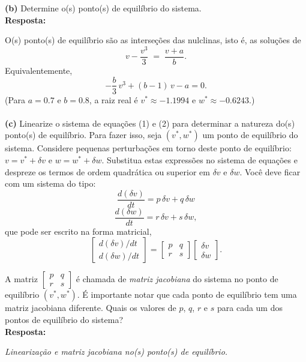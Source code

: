 \documentclass[english,11pt,a4paper]{article}
\begin{document}
	\noindent\textbf{(b)} Determine o(s) ponto(s) de equilíbrio do sistema.\\
	
	\noindent\textbf{Resposta:}
	
	\noindent O(s) ponto(s) de equilíbrio são as interseções das nulclinas, isto é, as soluções de
	\[
	v - \frac{v^3}{3} \;=\; \frac{v + a}{b}.
	\]
	\noindent Equivalentemente,
	\[
	-\frac{b}{3}\,v^3 + (b-1)\,v - a = 0.
	\]
	\noindent (Para $a=0.7$ e $b=0.8$, a raiz real é $v^\ast \approx -1.1994$ e $w^\ast \approx -0.6243$.)\\\\
	
	\noindent\textbf{(c)} Linearize o sistema de equações (1) e (2) para determinar a natureza do(s) ponto(s) de equilíbrio. Para fazer isso, seja $(v^*, w^*)$ um ponto de equilíbrio do sistema. Considere pequenas perturbações em torno deste ponto de equilíbrio: $v = v^* + \delta v$ e $w = w^* + \delta w$. Substitua estas expressões no sistema de equações e despreze os termos de ordem quadrática ou superior em $\delta v$ e $\delta w$. Você deve ficar com um sistema do tipo:
	\[
	\frac{d(\delta v)}{dt} = p\,\delta v + q\,\delta w
	\]
	\[
	\frac{d(\delta w)}{dt} = r\,\delta v + s\,\delta w,
	\]
	que pode ser escrito na forma matricial,
	\[
	\begin{bmatrix}
		d(\delta v)/dt \\[4pt]
		d(\delta w)/dt
	\end{bmatrix}
	=
	\begin{bmatrix}
		p & q \\[4pt]
		r & s
	\end{bmatrix}
	\begin{bmatrix}
		\delta v \\[4pt]
		\delta w
	\end{bmatrix}.
	\]
	
	A matriz $\begin{bmatrix} p & q \\ r & s \end{bmatrix}$ é chamada de \textit{matriz jacobiana} do sistema no ponto de equilíbrio $(v^*, w^*)$. É importante notar que cada ponto de equilíbrio tem uma matriz jacobiana diferente. Quais os valores de $p$, $q$, $r$ e $s$ para cada um dos pontos de equilíbrio do sistema?\\
	
	\noindent\textbf{Resposta:}
	
	\noindent\textit{Linearização e matriz jacobiana no(s) ponto(s) de equilíbrio.}
	
\end{document}
